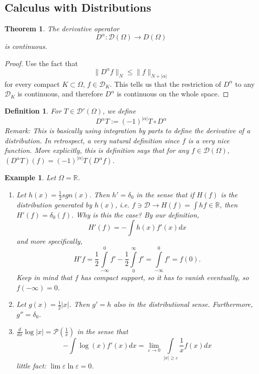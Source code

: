 \documentclass[letterpaper,twoside,11pt]{article}
\theoremstyle{mystyle}
\newtheorem{theorem}{Theorem}[section]
\newtheorem{definition}{Definition}[section]
\newtheorem*{ex}{Example}
\newcommand{\R}{{\mathbb R}}
\newcommand{\DD}{\mathcal D}
\newcommand{\cg}{\color{gray}}
\newcommand{\cbk}{\color{black}}
\begin{document}
\subsection{Calculus with Distributions}

\begin{tcolorbox}[colback=red!5!white,colframe=red!75!black]
\begin{theorem}
The derivative operator 
\[D^\alpha : \mathcal D (\Omega) \to D (\Omega)\] is continuous. 
\end{theorem}
\end{tcolorbox}
\begin{proof}
  Use the fact that 
  \[\|D^\alpha f\|_N \leq \|f\|_{N + |\alpha|}\]
  for every compact $K \subset \Omega$, $f\in \mathcal D_K$. This tells us that the restriction of $D^\alpha$ to any $\mathcal D_K$ is continuous, and therefore $D^\alpha$ is continuous on the whole space. 
\end{proof}
\begin{definition}
  For $T \in \DD'(\Omega)$, we define 
  \[D^\alpha T := (-1)^{|\alpha|} T\circ D^\alpha\]
  \cg Remark: This is basically using integration by parts to define the derivative of a distribution. In retrospect, a very natural definition since $f$ is a very nice function. More explicitly, this is definition says that for any $f \in \DD (\Omega)$, $(D^\alpha T) (f) = (-1)^{|\alpha|} T(D^\alpha f)$. \cbk
\end{definition}
\begin{ex}
  Let $\Omega = \R$. 
  \begin{enumerate}[label=(\alph*)]
    \item Let $h(x) = \frac{1}{2}{sgn} (x)$. Then $h' = \delta_0$ in the sense that if $H(f)$ is the distribution generated by $h(x)$, i.e. $f \ni \DD \to H(f) = \int hf \in \R$, then $H'(f) = \delta_0 (f)$. Why is this the case? 
    By our definition, 
    \[H'(f) = -\int h(x) f'(x) dx\]
    and more specifically, 
    \[H'f =  \frac{1}{2} \int\limits_{-\infty}^0 f' - \frac{1}{2}\int\limits_{0}^{\infty} f' = \int\limits_{-\infty}^0 f' = f(0).\]
    \cg Keep in mind that $f$ has compact support, so it has to vanish eventually, so $f(-\infty) = 0$. \cbk
    \item Let $g(x) = \frac{1}{2}|x|$. Then $g' = h$ also in the distributional sense. Furthermore, $g'' = \delta_0$. 
    \item $\displaystyle \frac{d}{dx}\log |x| = \mathcal P \left(\frac{1}{x}\right)$ in the sense that 
    \[ - \int {\log \left( x \right)f'\left( x \right)dx}  = \mathop {\lim }\limits_{\varepsilon  \to 0} \int\limits_{\left| x \right| \geqslant \varepsilon } {\frac{1}{x}f\left( x \right)dx} \]
    \cg little fact: $\lim \varepsilon \ln \varepsilon = 0$.\cbk 
  \end{enumerate}
\end{ex}
\end{document}

